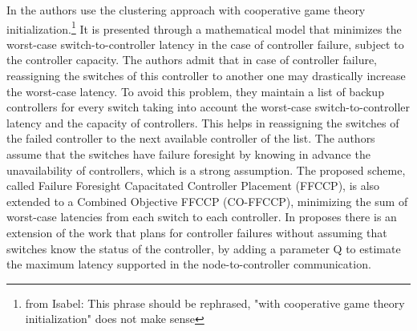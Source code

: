 \documentclass{IEEEtran}
\newcommand\fia[1]{{\color{red}\footnote{\color{red}from Isabel: #1}}} %
\newcommand\mia[1]{{\color{red}#1}}%
\newcommand\delia[1]{{\tiny{\color{red}#1}}} %
\begin{document}
In \cite{KiRa16} the authors use the clustering approach with cooperative game theory initialization.\fia{This phrase should be rephrased, "with cooperative game theory initialization" does not make sense} It is presented through a mathematical model that minimizes the worst-case switch-to-controller latency in the case of controller failure, subject to the controller capacity. The authors admit that in case of controller failure, reassigning the switches of this controller to another one may drastically increase the worst-case latency. To avoid this problem, they maintain a list of backup controllers for every switch taking into account the worst-case switch-to-controller latency and the capacity of controllers. This helps in reassigning the switches of the failed controller to the next available controller of the list. The authors assume that the switches have failure foresight by knowing in advance the unavailability of controllers, which is a strong assumption. The proposed scheme, called Failure Foresight Capacitated Controller Placement (FFCCP), is also extended to a Combined Objective FFCCP (CO-FFCCP), minimizing the sum of worst-case latencies from each switch to each controller. %
\delia{In} \cite{KiRa17} \mia{proposes} \delia{there is} an extension of the work that plans for controller failures without assuming that switches know the status of the controller, by adding a parameter \delia{Q} to estimate the maximum latency supported in the node-to-controller communication. 
\end{document}
